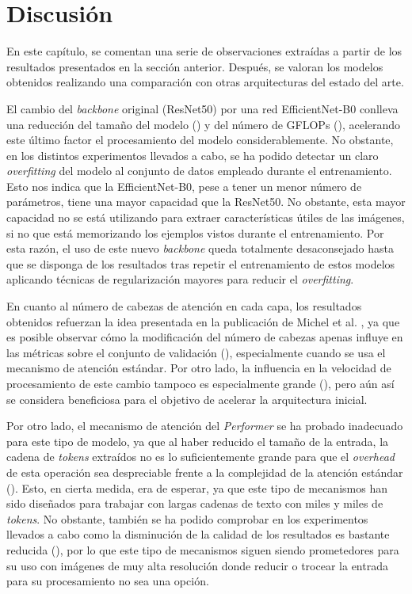 \section{Discusión}

En este capítulo, se comentan una serie de observaciones extraídas a partir de los resultados presentados en la sección anterior. Después, se valoran los modelos obtenidos realizando una comparación con otras arquitecturas del estado del arte.

El cambio del \textit{backbone} original (ResNet50) por una red EfficientNet-B0 conlleva una reducción del tamaño del modelo () y del número de GFLOPs (), acelerando este último factor el procesamiento del modelo considerablemente. No obstante, en los distintos experimentos llevados a cabo, se ha podido detectar un claro \textit{overfitting} del modelo al conjunto de datos empleado durante el entrenamiento. Esto nos indica que la EfficientNet-B0, pese a tener un menor número de parámetros, tiene una mayor capacidad que la ResNet50. No obstante, esta mayor capacidad no se está utilizando para extraer características útiles de las imágenes, si no que está memorizando los ejemplos vistos durante el entrenamiento. Por esta razón, el uso de este nuevo \textit{backbone} queda totalmente desaconsejado hasta que se disponga de los resultados tras repetir el entrenamiento de estos modelos aplicando técnicas de regularización mayores para reducir el \textit{overfitting}.

En cuanto al número de cabezas de atención en cada capa, los resultados obtenidos refuerzan la idea presentada en la publicación de Michel et al. \cite{are16headsbetterthan1}, ya que es posible observar cómo la modificación del número de cabezas apenas influye en las métricas sobre el conjunto de validación (), especialmente cuando se usa el mecanismo de atención estándar. Por otro lado, la influencia en la velocidad de procesamiento de este cambio tampoco es especialmente grande (), pero aún así se considera beneficiosa para el objetivo de acelerar la arquitectura inicial.

Por otro lado, el mecanismo de atención del \textit{Performer} se ha probado inadecuado para este tipo de modelo, ya que al haber reducido el tamaño de la entrada, la cadena de \textit{tokens} extraídos no es lo suficientemente grande para que el \textit{overhead} de esta operación sea despreciable frente a la complejidad de la atención estándar (). Esto, en cierta medida, era de esperar, ya que este tipo de mecanismos han sido diseñados para trabajar con largas cadenas de texto con miles y miles de \textit{tokens}. No obstante, también se ha podido comprobar en los experimentos llevados a cabo como la disminución de la calidad de los resultados es bastante reducida (), por lo que este tipo de mecanismos siguen siendo prometedores para su uso con imágenes de muy alta resolución donde reducir o trocear la entrada para su procesamiento no sea una opción.

